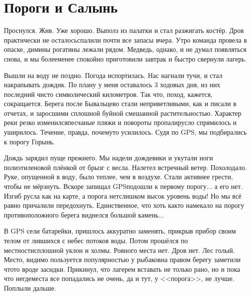 \chapter{Пороги и Салынь} 
\vepsianrose

Проснулся. Жив. Уже хорошо. Выполз из палатки и стал разжигать костёр. Дров практически не осталось\mdash спалили почти все запасы вчера. Утро команда провела в опаске, димины рогатины лежали рядом. Медведь, однако, и не думал появляться снова, и мы более\sdash менее спокойно приготовили завтрак и быстро свернули лагерь. 

Вышли на воду не поздно. Погода испортилась. Нас нагнали тучи, и стал накрапывать дождик. По плану у меня оставалось 3 ходовых дня, из них последний чисто символический километров. Так что, поход, кажется, сокращается. Берега после Бывальцево стали неприветливыми, как и писали в отчетах, и заросшими сплошной буйной смешанной растительностью. Характер реки резко изменился\mdash песчаные пляжи и повороты пропали\mdash русло спрямилось и уширилось. Течение, правда, почему\sdash то усилилось. Судя по GPS, мы подбирались к порогу Горынь.

Дождь зарядил пуще прежнего. Мы надели дождевики и укутали ноги полиэтиленовой плёнкой от брызг с весла. Налетел встречный ветер. Похолодало. Руке, опущенной в воду, было теплее, чем в воздухе. Стали активнее грести, чтобы не мёрзнуть. Вскоре запищал GPS\mdash подошли к первому порогу$\ldots$ а его нет. Изгиб русла как на карте, а порога нет\mdash слишком высок уровень воды! Но мы всё равно причалили передохнуть. Единственное, что хоть как\sdash то намекало на порог\mdash у противоположного берега виднелся большой камень$\ldots$ 

В GPS сели батарейки, пришлось аккуратно заменять, прикрыв прибор своим телом от лившихся с небес потоков воды. Потом прошёлся по местности\mdash сплошной уклон и холмы. Ровного места нет. Дров нет. Лес голый. Место, видимо пользуется популярностью у рыбаков\mdash на правом берегу заметили что\sdash то вроде засидки. Прикинул, что лагерем вставать не только рано, но и пока что негде\mdash места все попадались не очень, да и тут, у <<порога>>, не лучше. Поплыли дальше. 

